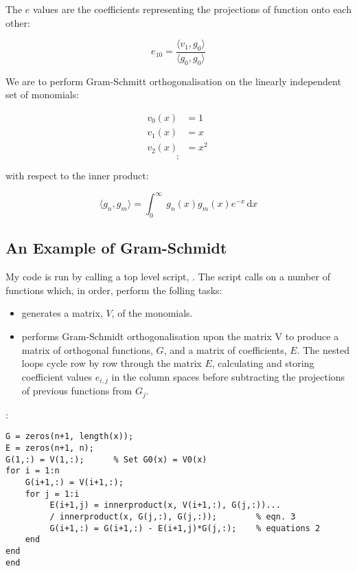 \documentclass{article}
\begin{document}
The $e$ values are the coefficients representing the projections of function onto each other:

\begin{equation}
e_{10} =  \frac{\langle v_1, g_0 \rangle}{\langle g_0, g_0 \rangle} 
\end{equation}


We are to perform Gram-Schmitt orthogonalisation on the linearly independent set of monomials:

\begin{subequations}\label{eqn:main}
    \begin{alignat}{2}
      v_0(x) &= 1\label{subeqn:a} \\
      v_1(x) &= x \label{subeqn:b} \\
      v_2(x) &= x^2  \label{subeqn:c} \
    \end{alignat}
\end{subequations}
$$
:
$$

with respect to the inner product:

$$ \langle g_n, g_m \rangle = \int_0^\infty \ g_n(x)g_m(x)e^{-x} \, \mathrm{d}x $$

\subsection{An Example of Gram-Schmidt}

My code is run by calling a top level script, . The script calls on a number of functions which, in order, perform the folling tasks:

\begin{itemize}

\item {} generates a matrix, $V$, of the monomials.

\item {} performs Gram-Schmidt orthogonalisation upon the matrix V to produce a matrix of orthogonal functions, $G$, and a matrix of coefficients, $E$. The nested  loops cycle row by row through the matrix $E$, calculating and storing coefficient values $e_{i,j}$ in the column spaces before subtracting the projections of previous functions from $G_j$.

\end{itemize}


:

\begin{lstlisting}
G = zeros(n+1, length(x));
E = zeros(n+1, n);
G(1,:) = V(1,:);      % Set G0(x) = V0(x)
for i = 1:n    
    G(i+1,:) = V(i+1,:);    
    for j = 1:i  
         E(i+1,j) = innerproduct(x, V(i+1,:), G(j,:))...
         / innerproduct(x, G(j,:), G(j,:));        % eqn. 3
         G(i+1,:) = G(i+1,:) - E(i+1,j)*G(j,:);    % equations 2
    end
end
end 
\end{lstlisting}
\end{document}
